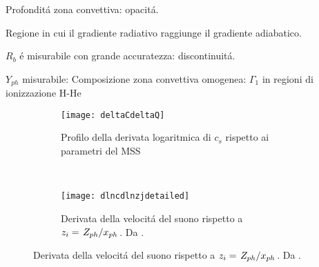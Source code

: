 \documentclass[../main.tex]{subfiles}
\begin{document}
\begin{workout}

Profondit\'a zona convettiva: opacit\'a. 

Regione in cui il gradiente radiativo raggiunge il gradiente adiabatico.


$R_b$ \'e misurabile con grande accuratezza: discontinuit\'a.

$Y_{ph}$ misurabile: Composizione zona convettiva omogenea:  $\Gamma_1$ in regioni di ionizzazione H-He

\begin{figure}[!h]
\begin{subfigure}[r]{0.6\textwidth}
        \texttt{[image: deltaCdeltaQ]}
        \caption{Profilo della derivata logaritmica di $c_s$ rispetto ai parametri del MSS}
    \end{subfigure}
~
\begin{subfigure}[r]{0.4\textwidth}
        \texttt{[image: dlncdlnzjdetailed]}
        \caption{Derivata della velocit\'a del suono rispetto a $z_i=\left.{Z_{ph}}\middle/{x_{ph}}\right.$. Da \cite{villante2014chemical}.}
    \end{subfigure}
\end{figure}

\end{workout}
\end{document}
